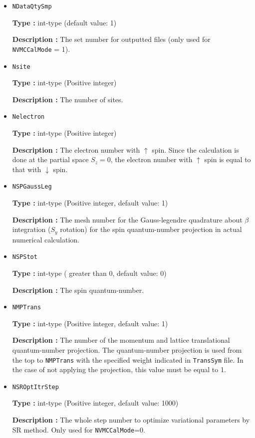 \begin{itemize}
 \item  \verb|NDataQtySmp|

 {\bf Type :} int-type (default value: 1)

{\bf Description :} The set number for outputted files (only used for \verb|NVMCCalMode| = 1). 

 \item  \verb|Nsite|

{\bf Type :} int-type (Positive integer)

{\bf Description :} The number of sites.  

\item  \verb|Nelectron|

{\bf Type :} int-type (Positive integer)

{\bf Description :} The electron number with $\uparrow$ spin. Since the calculation is done at the partial space $S_z=0$,  the electron number with $\uparrow$ spin is equal to that with $\downarrow$ spin.

 \item  \verb|NSPGaussLeg|

{\bf Type :} {int-type (Positive integer, default value: 1)}

{\bf Description :} The mesh number for the Gauss-legendre quadrature about $\beta$ integration ($S_y$ rotation) for the spin quantum-number projection in actual numerical calculation.

 \item  \verb|NSPStot|

{\bf Type :} int-type ( greater than 0,  default value: 0)

{\bf Description :}   The spin quantum-number. 

 \item  \verb|NMPTrans|

{\bf Type :} int-type (Positive integer, default value: 1)

{\bf Description :} 
The number of the momentum and lattice translational quantum-number projection. The quantum-number projection is used from the top to \verb|NMPTrans| with the specified weight indicated in \verb|TransSym| file. In the case of not applying the projection, this value must be equal to 1.

 \item  \verb|NSROptItrStep|

{\bf Type :} int-type (Positive integer, default value: 1000)

{\bf Description :} 
The whole step number to optimize variational parameters by SR method. Only used for \verb|NVMCCalMode|=0.
 

\end{itemize}
